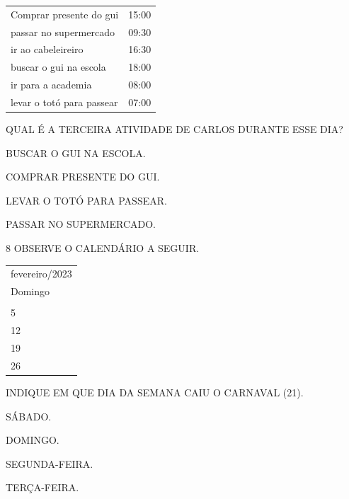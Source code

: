 \begin{longtable}[]{@{}ll@{}}
\toprule
Comprar presente do gui & 15:00\tabularnewline
passar no supermercado & 09:30\tabularnewline
ir ao cabeleireiro & 16:30\tabularnewline
buscar o gui na escola & 18:00\tabularnewline
ir para a academia & 08:00\tabularnewline
levar o totó para passear & 07:00\tabularnewline
\bottomrule\end{longtable}

QUAL É A TERCEIRA ATIVIDADE DE CARLOS DURANTE ESSE DIA?

\begin{escolha}
\item BUSCAR O GUI NA ESCOLA.

\item COMPRAR PRESENTE DO GUI.

\item LEVAR O TOTÓ PARA PASSEAR.

\item PASSAR NO SUPERMERCADO.
\end{escolha}


\num{8} OBSERVE O CALENDÁRIO A SEGUIR.

\begin{longtable}[]{@{}l@{}}
\toprule
fevereiro/2023\tabularnewline
Domingo\tabularnewline
\tabularnewline
5\tabularnewline
12\tabularnewline
19\tabularnewline
26\tabularnewline
\bottomrule
\end{longtable}

INDIQUE EM QUE DIA DA SEMANA CAIU O CARNAVAL (21).

\begin{escolha}
\item SÁBADO.

\item DOMINGO.

\item SEGUNDA-FEIRA.

\item TERÇA-FEIRA.
\end{escolha}



